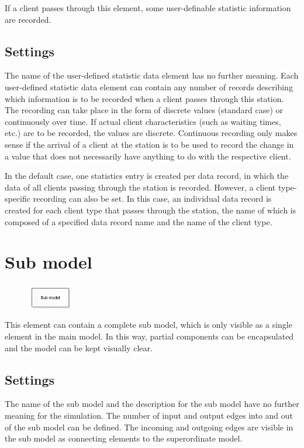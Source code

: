 If a client passes through this element, some user-definable statistic information are recorded.

\subsection*{Settings}

The name of the user-defined statistic data element has no further meaning.
Each user-defined statistic data element can contain any number of records
describing which information is to be recorded when a client passes through
this station. The recording can take place in the form of discrete values
(standard case) or continuously over time. If actual client characteristics
(such as waiting times, etc.) are to be recorded, the values are discrete.
Continuous recording only makes sense if the arrival of a client at the station
is to be used to record the change in a value that does not necessarily have
anything to do with the respective client.

In the default case, one statistics entry is created per data record,
in which the data of all clients passing through the station is recorded.
However, a client type-specific recording can also be set. In this case,
an individual data record is created for each client type that passes through
the station, the name of which is composed of a specified data record name
and the name of the client type.


\section{Sub model}
\label{ref:ModelElementSub}

\begin{figure}
\vspace{-22pt}
\includegraphics[width=2cm]{imageModelElementSub.png}
\vspace{-22pt}
\end{figure}

This element can contain a complete sub model, which is only visible as a single element in the main model.
In this way, partial components can be encapsulated and the model can be kept visually clear.

\subsection*{Settings}

The name of the sub model and the description for the sub model have
no further meaning for the simulation.
The number of input and output edges into and out of the sub model can
be defined. The incoming and outgoing edges are visible in the sub model
as connecting elements to the superordinate model.





